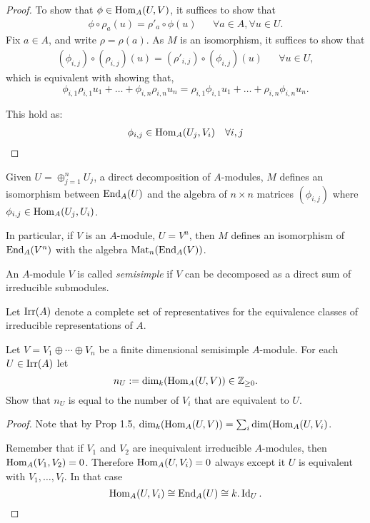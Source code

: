 \begin{proof}
To show that \(\phi \in \operatorname{Hom}_A(U,V)\), it suffices to show that
\begin{align*}
\phi \circ \rho _{a}(u)=\rho '_{a}\circ \phi (u) &&\forall a\in A,\forall u\in U.
\end{align*}
Fix \(a\in A\), and write \(\rho =\rho (a)\). As $M$ is an isomorphism, it suffices to show that
\begin{align*}
(\phi _{i,j})\circ (\rho _{i,j})(u)=(\rho '_{i,j})\circ (\phi _{i,j})(u) &&\forall u\in U,
\end{align*}
which is equivalent with showing that,
\[
\phi _{i,1}\rho _{i,1}u_{1}+\ldots +\phi _{i,n}\rho _{i,n}u_{n}=\rho _{i,1}\phi _{i,1}u_{1}+\ldots +\rho _{i,n}\phi _{i,n}u_{n}.
\]

This hold as:
\begin{align*}
\phi _{i,j}\in \operatorname{Hom}_A(U_{j},V_{i}) &&\forall i,j
\end{align*}
\end{proof}

\begin{prop}
Given \(U=\oplus _{j=1}^nU_{j}\), a direct decomposition of \(A\)-modules, \(M\) defines an isomorphism between \(\operatorname{End}_A(U)\) and the algebra of \(n\times n\) matrices \((\phi _{i,j})\) where \(\phi _{i,j}\in \operatorname{Hom}_A(U_{j},U_{i})\).

In particular, if \(V\) is an \(A\)-module, \(U=V^n\), then \(M\) defines an isomorphism of \(\operatorname{End}_A(V^n)\) with the algebra \(\operatorname{Mat}_{n}(\operatorname{End}_A(V))\).
\end{prop}

\begin{defn}
An \(A\)-module \(V\) is called \emph{semisimple} if \(V\) can be decomposed as a direct sum of irreducible submodules.
\end{defn}

\begin{defn}
Let \(\operatorname{Irr}(A)\) denote a complete set of representatives for the equivalence classes of irreducible representations of \(A\).
\end{defn}

\begin{prop}
Let \(V=V_{1}\oplus \cdots \oplus V_{n}\) be a finite dimensional semisimple \(A\)-module. For each \(U\in \operatorname{Irr}(A)\) let
\[
n_U:=\dim_{k} (\operatorname{Hom}_A(U,V)) \in  \Bbb{Z}_{\geq 0}.
\]
Show that \(n_U\) is equal to the number of \(V_{i}\) that are equivalent to \(U\).
\end{prop}

\begin{proof}
Note that by Prop 1.5, \(\dim_{k}(\operatorname{Hom}_A(U,V))=\sum _{i}\dim(\operatorname{Hom}_A(U,V_{i})\).

Remember that if \(V_{1}\) and \(V_{2}\) are inequivalent irreducible \(A\)-modules, then \(\operatorname{Hom}_A(V_{1},V_{2})=0\). Therefore \(\operatorname{Hom}_A(U,V_{i})=0\) always except it \(U\) is equivalent with \(V_{1},\ldots ,V_{l}\). In that case
\[
\operatorname{Hom}_A(U,V_{i})\cong \operatorname{End}_A(U)\cong k.\operatorname{Id}_U.
\]
\end{proof}

